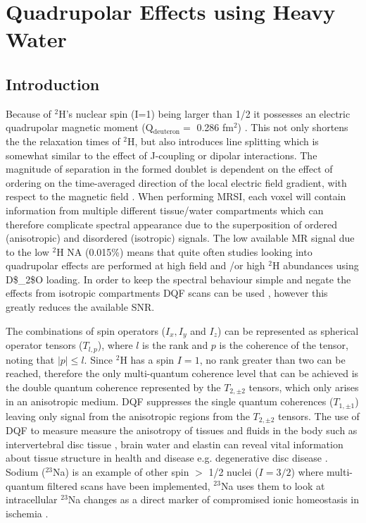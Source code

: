 \chapter{Quadrupolar Effects using Heavy Water}
\label{Chap:Quad}

\section{Introduction}

Because of $^2$H's nuclear spin (I=1) being larger than 1/2 it possesses an electric quadrupolar magnetic moment (Q$_{\text{deuteron}}=$ 0.286 fm$^2$)  \cite{Stone2015NuclearData}. This not only shortens the the relaxation times of $^2$H, but also introduces line splitting which is somewhat similar to the effect of J-coupling or dipolar interactions. The magnitude of separation in the formed doublet is dependent on the effect of ordering on the time-averaged direction of the local electric field gradient, with respect to the magnetic field \cite{Seelig1977DeuteriumMembranes, Eliav2016MultipleMRS}. When performing \ac{MRSI}, each voxel will contain information from multiple different tissue/water compartments which can therefore complicate spectral appearance due to the superposition of ordered (anisotropic) and disordered (isotropic) signals. The low available MR signal due to the low $^2$H \ac{NA} (0.015\%) means that quite often studies looking into quadrupolar effects are performed at high field  \cite{Gursan2022ResidualMuscle} and \cite{Ooms2015DoubleTissue}/or \cite{Damion2022DoubleLoading} high $^2$H abundances using \ac{D$_2$O} loading. In order to keep the spectral behaviour simple and negate the effects from isotropic compartments \ac{DQF} scans can be used \cite{Sharf1995DetectionNMR-Spectroscopy, Perea20072HDisc}, however this greatly reduces the available \ac{SNR}. 

The combinations of spin operators ($I_x, I_y$ and $I_z$) can be represented as spherical operator tensors ($T_{l,p}$), where $l$ is the rank and $p$ is the coherence of the tensor, noting that $|p| \le l$. Since $^2$H has a spin $I=1$, no rank greater than two can be reached, therefore the only multi-quantum coherence level that can be achieved is the double quantum coherence represented by the $T_{2,\pm2}$ tensors, which only arises in an anisotropic medium. \ac{DQF} suppresses the single quantum coherences ($T_{1,\pm1}$) leaving only signal from the anisotropic regions from the $T_{2,\pm2}$ tensors. The use of \ac{DQF} to measure measure the anisotropy of tissues and fluids in the body such as intervertebral disc tissue  \cite{Ooms2015DoubleTissue}, brain water \cite{Assaf1997InSpectroscopy} and elastin \cite{Sun2010InvestigationNMR} can reveal vital information about tissue structure in health and disease e.g. degenerative disc disease \cite{Ooms2015DoubleTissue}. Sodium ($^{23}$Na) is an example of other spin $>$ 1/2 nuclei ($I=3/2$) where multi-quantum filtered scans have been implemented, $^{23}$Na uses them to look at intracellular $^{23}$Na changes as a direct marker of compromised ionic homeostasis in ischemia \cite{Tsang2012Triple-quantum-filteredT}.

